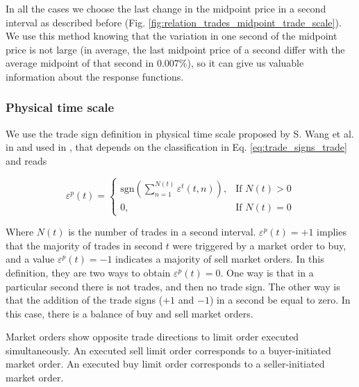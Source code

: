 In all the cases we choose the last change in the midpoint price in a second
interval as described before
(Fig. \ref{fig:relation_trades_midpoint_trade_scale}). We use this method
knowing that the variation in one second of the midpoint price is not large
(in average, the last midpoint price of a second differ with the average
midpoint of that second in $0.007\%$), so it can give us valuable information
about the response functions.

\subsubsection{Physical time scale}\label{subsubsec:physical_time}

We use the trade sign definition in physical time scale proposed by
S. Wang et al. in \cite{Wang_2016_cross} and used in
\cite{Wang_2016_avg,Wang_2017}, that depends on the classification in
Eq. \ref{eq:trade_signs_trade} and reads

\begin{equation}\label{eq:trade_signs_physical}
    \varepsilon^{p}\left(t\right)=\left\{
    \begin{array}{cc}
    \text{sgn}\left(\sum_{n=1}^{N\left(t\right)}\varepsilon^{t}
    \left(t,n\right)\right),
    & \text{If }N \left(t\right)>0\\
    0, & \text{If }N\left(t\right)=0
    \end{array}\right.
\end{equation}

Where $N \left(t \right)$ is the number of trades in a second interval.
$\varepsilon^{p}\left( t \right) = +1$ implies that the majority of
trades in second $t$ were triggered by a market order to buy, and a value
$\varepsilon^{p}\left( t \right) = -1$ indicates a majority of sell
market orders. In this definition, they are two ways to obtain
$\varepsilon^{p}\left( t \right) = 0$. One way is that in a particular
second there is not trades, and then no trade sign. The other  way is that the
addition of the trade signs ($+1$ and $-1$) in a second be equal to zero. In
this case, there is a balance of buy and sell market orders.

Market orders show opposite trade directions to limit order executed
simultaneously. An executed sell limit order corresponds to a buyer-initiated
market order. An executed buy limit order corresponds to a seller-initiated
market order.

